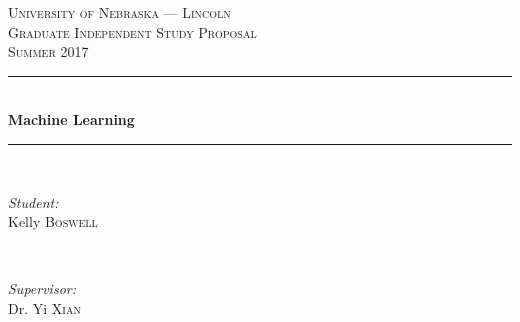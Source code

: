 \documentclass[12pt]{article}
\begin{document}
\begin{titlepage}

\newcommand{\HRule}{\rule{\linewidth}{0.5mm}} %

\center %
 

\textsc{\LARGE University of Nebraska --- Lincoln}\\[1.5cm] %
\textsc{\Large Graduate Independent Study Proposal}\\[0.5cm] %
\textsc{\large Summer 2017}\\[0.5cm] %


\HRule \\[0.4cm]
{ \huge \bfseries Machine Learning}\\[0.4cm] %
\HRule \\[1.5cm]
 

\begin{minipage}{0.4\textwidth}
\begin{flushleft} \large
\emph{Student:}\\
Kelly \textsc{Boswell} %
\end{flushleft}
\end{minipage}
~
\begin{minipage}{0.4\textwidth}
\begin{flushright} \large
\emph{Supervisor:} \\
Dr. Yi \textsc{Xian} %
\end{flushright}
\end{minipage}\\[4cm]

\end{titlepage}
\end{document}
